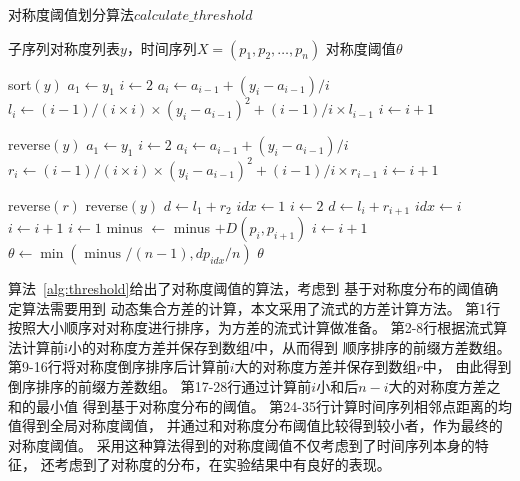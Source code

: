 \begin{algorithm}[t]
  \caption{对称度阈值划分算法$calculate\_threshold$}
  \label{alg:threshold}
  \small
  \begin{algorithmic}
    \REQUIRE 子序列对称度列表$y$，时间序列$X=\left(p_{1}, p_{2}, \dots, p_{n}\right)$
    \ENSURE 对称度阈值$\theta$

    \STATE sort$(y)$
    \STATE $a_1 \leftarrow y_1$
    \STATE $i \leftarrow 2$
    \STATE $a_i \leftarrow a_{i-1}+(y_i-a_{i-1})/{i}$
    \STATE $l_i \leftarrow (i-1) / (i \times i) \times(y_i-a_{i-1})^{2}+(i-1) / i \times l_{i-1}$
    \STATE $i \leftarrow i+1$
    \ENDWHILE

    \STATE reverse$(y)$
    \STATE $a_1 \leftarrow y_1$
    \STATE $i \leftarrow 2$
    \STATE $a_i \leftarrow a_{i-1}+(y_i-a_{i-1})/{i}$
    \STATE $r_i \leftarrow (i-1) / (i \times i) \times(y_i-a_{i-1})^{2}+(i-1) / i \times r_{i-1}$
    \STATE $i \leftarrow i+1$
    \ENDWHILE

    \STATE reverse$(r)$
    \STATE reverse$(y)$
    \STATE $d \leftarrow l_1 + r_2$
    \STATE $idx \leftarrow 1$
    \STATE $i \leftarrow 2$
    \STATE $d \leftarrow l_i + r_{i+1}$
    \STATE $idx \leftarrow i$
    \ENDIF
    \STATE $i \leftarrow i+1$
    \ENDWHILE
    \STATE $i \leftarrow 1$
    \STATE minus $\leftarrow$ minus $+D\left(p_{i}, p_{i+1}\right)$
    \STATE $i \leftarrow i+1$
    \ENDWHILE
    \STATE $\theta \leftarrow \min \left({\text { minus }} / (n-1), {dp_{idx}} / {n}\right)$
    \RETURN $\theta$
  \end{algorithmic}
\end{algorithm}

算法~\ref{alg:threshold}给出了对称度阈值的算法，考虑到
基于对称度分布的阈值确定算法需要用到
动态集合方差的计算，本文采用了流式的方差计算方法。
第1行按照大小顺序对对称度进行排序，为方差的流式计算做准备。
第2-8行根据流式算法计算前i小的对称度方差并保存到数组$l$中，从而得到
顺序排序的前缀方差数组。
第9-16行将对称度倒序排序后计算前$i$大的对称度方差并保存到数组$r$中，
由此得到倒序排序的前缀方差数组。
第17-28行通过计算前$i$小和后$n-i$大的对称度方差之和的最小值
得到基于对称度分布的阈值。
第24-35行计算时间序列相邻点距离的均值得到全局对称度阈值，
并通过和对称度分布阈值比较得到较小者，作为最终的对称度阈值。
采用这种算法得到的对称度阈值不仅考虑到了时间序列本身的特征，
还考虑到了对称度的分布，在实验结果中有良好的表现。

